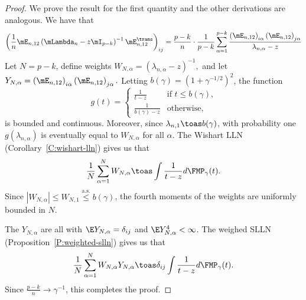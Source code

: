 \begin{proof}
We prove the result for the first quantity and the other derivations are analogous.  We have that
\begin{align*}
    \left(
        \frac{1}{n}
        \mE_{n,12}
        \left(
            \mLambda_n
            -
            z \mI_{p-k}
        \right)^{-1}
        \mE_{n,12}^\trans    
    \right)_{ij}
    =
    \frac{p-k}{n}
    \cdot
    \frac{1}{p-k}
    \sum_{\alpha=1}^{p-k}
        \frac{ \left( \mE_{n,12} \right)_{i\alpha}
               \left( \mE_{n,12} \right)_{j\alpha}
             }
             { \lambda_{n,\alpha} - z }
\end{align*}
Let $N = p-k$, define weights 
\(
    W_{N,\alpha} = (\lambda_{n,\alpha} - z)^{-1},
\)
and let
\(
    Y_{N,\alpha} = \left( \mE_{n,12} \right)_{i\alpha}
                   \left( \mE_{n,12} \right)_{j\alpha}.
\)
Letting $b(\gamma) = \left( 1 + \gamma^{-1/2} \right)^2$, the function
\[
    g(t) 
    = 
    \begin{cases}
        \frac{1}{t - z} 
            &\text{if $t \leq b(\gamma)$,} \\
        \frac{1}{b(\gamma) - z}
            &\text{otherwise,}
    \end{cases}
\]
is bounded and continuous.  Moreover, since $\lambda_{n,1} \toas b(\gamma)$, with probability one $g(\lambda_{n,\alpha})$ is eventually equal to $W_{N,\alpha}$ for all $\alpha$.  The Wishart LLN (Corollary~\ref{C:wishart-lln}) gives us that
\[
    \frac{1}{N}
    \sum_{\alpha=1}^N W_{N,\alpha}
        \toas
            \int
                \frac{1}{t - z} d\FMP_\gamma(t).
\]
Since $| W_{N,\alpha} | \leq W_{N,1} \overset{\text{a.s.}}{\leq} b(\gamma)$, the fourth moments of the weights are uniformly bounded in $N$.  

The $Y_{N,\alpha}$ are all \iid with $\E Y_{N,\alpha} = \delta_{ij}$ and $\E Y_{N,\alpha}^4 < \infty$.  The weighed SLLN (Proposition~\ref{P:weighted-slln}) gives us that
\[
    \frac{1}{N}
    \sum_{\alpha=1}^N
        W_{N,\alpha}
        Y_{N,\alpha}
    \toas
        \delta_{ij}
        \int
            \frac{1}{t - z} d\FMP_\gamma(t).
\]
Since $\frac{p-k}{n} \to \gamma^{-1}$, this completes the proof.
\end{proof}


